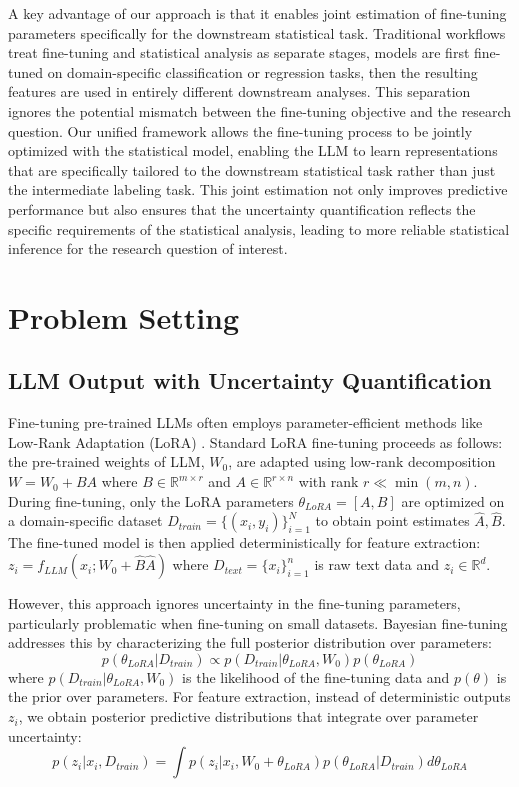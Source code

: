 \documentclass[11pt]{article}
\begin{document}
A key advantage of our approach is that it enables joint estimation of fine-tuning parameters specifically for the downstream statistical task. Traditional workflows treat fine-tuning and statistical analysis as separate stages, models are first fine-tuned on domain-specific classification or regression tasks, then the resulting features are used in entirely different downstream analyses. This separation ignores the potential mismatch between the fine-tuning objective and the research question. Our unified framework allows the fine-tuning process to be jointly optimized with the statistical model, enabling the LLM to learn representations that are specifically tailored to the downstream statistical task rather than just the intermediate labeling task. This joint estimation not only improves predictive performance but also ensures that the uncertainty quantification reflects the specific requirements of the statistical analysis, leading to more reliable statistical inference for the research question of interest.

\section{Problem Setting}

\subsection{LLM Output with Uncertainty Quantification}

Fine-tuning pre-trained LLMs often employs parameter-efficient methods like Low-Rank Adaptation (LoRA) \citep{hu2022lora}. Standard LoRA fine-tuning proceeds as follows: the pre-trained weights of LLM, $W_0$, are adapted using low-rank decomposition $W = W_0 + BA$ where $B \in \mathbb{R}^{m \times r}$ and $A \in \mathbb{R}^{r \times n}$ with rank $r \ll \min(m, n)$. During fine-tuning, only the LoRA parameters $\theta_{LoRA} = [A, B]$ are optimized on a domain-specific dataset $D_{train} = \{(x_i, y_i)\}_{i=1}^N$ to obtain point estimates $\hat{A}, \hat{B}$. The fine-tuned model is then applied deterministically for feature extraction: $z_i = f_{LLM}(x_i; W_0 + \hat{B}\hat{A})$ where $D_{text} = \{x_i\}_{i=1}^n$ is raw text data and $z_i \in \mathbb{R}^d$.

However, this approach ignores uncertainty in the fine-tuning parameters, particularly problematic when fine-tuning on small datasets. Bayesian fine-tuning \citep{yang2023bayesian, wang2024blob} addresses this by characterizing the full posterior distribution over parameters:
\begin{equation}
p(\theta_{LoRA}|D_{train}) \propto p(D_{train}|\theta_{LoRA}, W_0)p(\theta_{LoRA})
\end{equation}
where $p(D_{train}|\theta_{LoRA}, W_0)$ is the likelihood of the fine-tuning data and $p(\theta)$ is the prior over parameters. For feature extraction, instead of deterministic outputs $z_i$, we obtain posterior predictive distributions that integrate over parameter uncertainty:
\begin{equation}
p(z_i|x_i, D_{train}) = \int p(z_i|x_i, W_0 + \theta_{LoRA})p(\theta_{LoRA}|D_{train})d\theta_{LoRA}
\end{equation}
\end{document}
